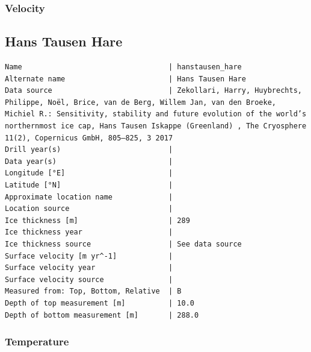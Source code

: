 \documentclass[article,a4paper,times,11pt,twoside]{article}
\begin{document}
\subsubsection{Velocity}
\label{sec:orgf372721}
\clearpage
\subsection{Hans Tausen Hare}
\label{sec:orga051b5a}
\begin{verbatim}
Name                                  | hanstausen_hare
Alternate name                        | Hans Tausen Hare
Data source                           | Zekollari, Harry, Huybrechts, Philippe, Noël, Brice, van de Berg, Willem Jan, van den Broeke, Michiel R.: Sensitivity, stability and future evolution of the world’s northernmost ice cap, Hans Tausen Iskappe (Greenland) , The Cryosphere 11(2), Copernicus GmbH, 805–825, 3 2017 
Drill year(s)                         | 
Data year(s)                          | 
Longitude [°E]                        | 
Latitude [°N]                         | 
Approximate location name             | 
Location source                       | 
Ice thickness [m]                     | 289
Ice thickness year                    | 
Ice thickness source                  | See data source
Surface velocity [m yr^-1]            | 
Surface velocity year                 | 
Surface velocity source               | 
Measured from: Top, Bottom, Relative  | B
Depth of top measurement [m]          | 10.0
Depth of bottom measurement [m]       | 288.0
\end{verbatim}

\subsubsection{Temperature}
\label{sec:org8bd5c91}
\end{document}
